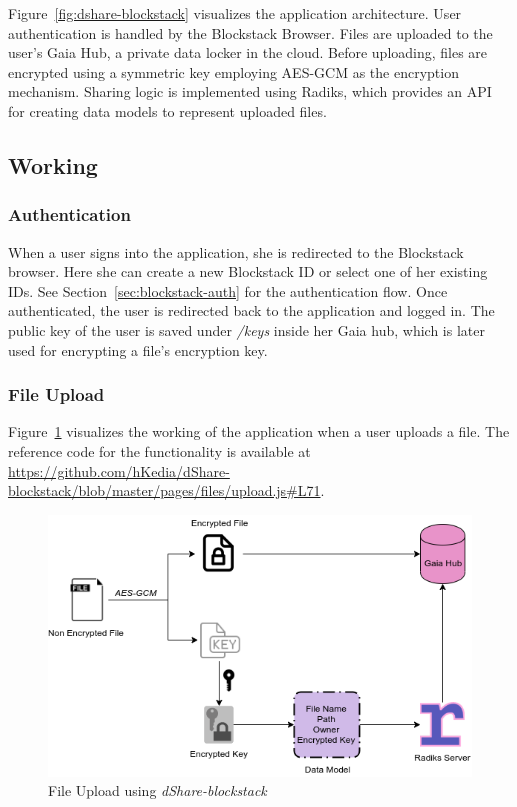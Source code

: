 Figure~\ref{fig:dshare-blockstack} visualizes the application architecture. User authentication is handled by the Blockstack Browser. Files are uploaded to the user's Gaia Hub, a private data locker in the cloud. Before uploading, files are encrypted using a symmetric key employing AES-GCM as the encryption mechanism. Sharing logic is implemented using Radiks, which provides an API for creating data models to represent uploaded files.

\subsection{Working}

\subsubsection{Authentication}
When a user signs into the application, she is redirected to the Blockstack browser. Here she can create a new Blockstack ID or select one of her existing IDs. See Section~\ref{sec:blockstack-auth} for the authentication flow. Once authenticated, the user is redirected back to the application and logged in. The public key of the user is saved under \textit{/keys} inside her Gaia hub, which is later used for encrypting a file's encryption key.

\subsubsection{File Upload}
Figure~\ref{fig:blockstack-upload} visualizes the working of the application when a user uploads a file. The reference code for the functionality is available at \url{https://github.com/hKedia/dShare-blockstack/blob/master/pages/files/upload.js#L71}.

\begin{figure}[h]
	\includegraphics[width=\linewidth]{figures/blockstack-upload}
	\caption{\label{fig:blockstack-upload} File Upload using \textit{dShare-blockstack}}
\end{figure}

